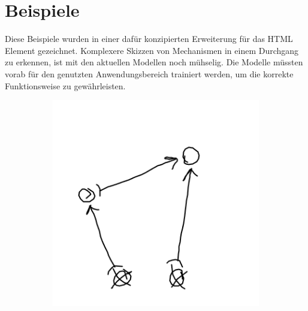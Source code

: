 \section{Beispiele}
Diese Beispiele wurden in einer dafür konzipierten Erweiterung für das  HTML Element gezeichnet.
Komplexere Skizzen von Mechanismen in einem Durchgang zu erkennen, ist mit den aktuellen Modellen noch mühselig.
Die Modelle müssten vorab für den genutzten Anwendungsbereich trainiert werden, um die korrekte Funktionsweise zu gewährleisten.

\begin{figure}[H]
    \centering
    \begin{subfigure}[b]{0.3\textwidth}
        \includegraphics[width=\textwidth]{images/4bar_sketch.png}
        \caption{}
        \label{fig:4bar_sketch}
    \end{subfigure}
    \begin{subfigure}[b]{0.3\textwidth}

\end{subfigure}
\end{figure}
